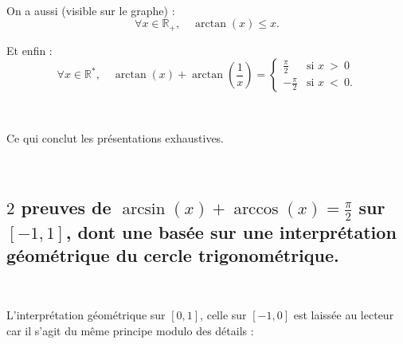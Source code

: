 \documentclass{article}
\begin{document}
\

On a aussi (visible sur le graphe) : 
\[
\forall x \in \mathbb{R}_+, \quad \arctan(x) \leq x.
\]

Et enfin : 
\[
\forall x \in \mathbb{R}^*, \quad \arctan(x) + \arctan \left( \frac{1}{x} \right) = 
\left\{ \begin{array}{cl}
\frac{\pi}{2} & \text{si } x \ > \ 0 \\
-\frac{\pi}{2} & \text{si } x \ < \ 0.
\end{array} \right.
\]

\

Ce qui conclut les présentations exhaustives.

\

\subsection{$2$ preuves de $\arcsin(x) + \arccos(x) =\frac{\pi}{2}$ sur $[-1,1]$, dont une basée sur une interprétation géométrique du cercle trigonométrique.} 

\

L'interprétation géométrique sur $[0,1]$, celle sur $[-1,0]$ est laissée au lecteur car il s'agit du même principe modulo des détails : 
\end{document}
